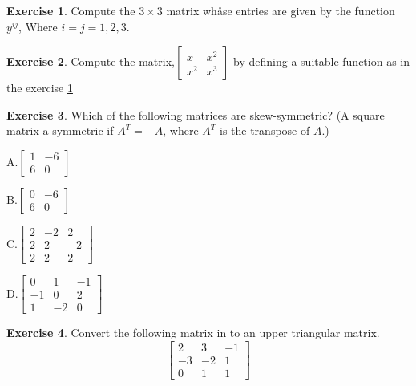 \documentclass[
]{book}
\theoremstyle{definition}
\theoremstyle{definition}
\theoremstyle{definition}
\newtheorem{exercise}{Exercise}[chapter]
\theoremstyle{definition}
\theoremstyle{remark}
\begin{document}
\begin{exercise}
\protect\hypertarget{exr:qthree}{}\label{exr:qthree}Compute the \(3\times 3\) matrix whåse entries are given by the function \(y^{ij}\), Where \(i = j = 1, 2, 3\).
\end{exercise}

\begin{exercise}
\protect\hypertarget{exr:unnamed-chunk-3}{}\label{exr:unnamed-chunk-3}Compute the matrix,\(\begin{bmatrix}
  x & x^2 \\x^2 & x^3
  \end{bmatrix}\)
by defining a suitable function as in the exercise \ref{exr:qthree}
\end{exercise}

\begin{exercise}
\protect\hypertarget{exr:unnamed-chunk-4}{}\label{exr:unnamed-chunk-4}Which of the following matrices are skew-symmetric?
(A square matrix a symmetric if \(A^T = -A\), where \(A^T\) is the transpose of \(A\).)

A.\(\begin{bmatrix} 1 & -6 \\ 6 & 0 \end{bmatrix}\)

B.\(\begin{bmatrix} 0 & -6 \\ 6 & 0 \end{bmatrix}\)

C.\(\begin{bmatrix} 2 & -2 & 2 \\ 2 & 2 & -2 \\ 2 & 2 & 2 \end{bmatrix}\)

D.\(\begin{bmatrix} 0 & 1 & -1 \\ -1 & 0 & 2 \\ 1 & -2 & 0\end{bmatrix}\)
\end{exercise}

\begin{exercise}
\protect\hypertarget{exr:unnamed-chunk-5}{}\label{exr:unnamed-chunk-5}Convert the following matrix in to an upper triangular matrix.
\[\begin{bmatrix} 2 & 3 & -1 \\ -3 & -2 & 1 \\  0& 1 & 1\end{bmatrix}\]
\end{exercise}
\end{document}
